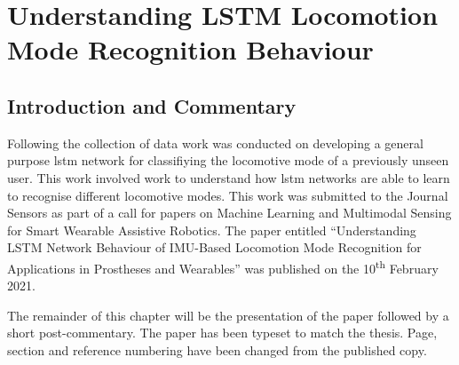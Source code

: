 \chapter{Understanding LSTM Locomotion Mode Recognition Behaviour}
\label{chp:lstm-general}

\section{Introduction and Commentary}
Following the collection of data work was conducted on developing a general purpose \acrshort{lstm} network for classifiying the locomotive mode of a previously unseen user. This work involved work to understand how \acrshort{lstm} networks are able to learn to recognise different locomotive modes. This work was submitted to the Journal Sensors as part of a call for papers on Machine Learning and Multimodal Sensing for Smart Wearable Assistive Robotics. The paper entitled ``Understanding LSTM Network Behaviour of IMU-Based Locomotion Mode Recognition for Applications in Prostheses and Wearables'' was published on the 10\textsuperscript{th} February 2021.

\newcommand\x{\value{page}}
The remainder of this chapter will be the presentation of the paper followed by a short post-commentary. %
The paper has been typeset to match the thesis. Page, section and reference numbering have been changed from the published copy.

